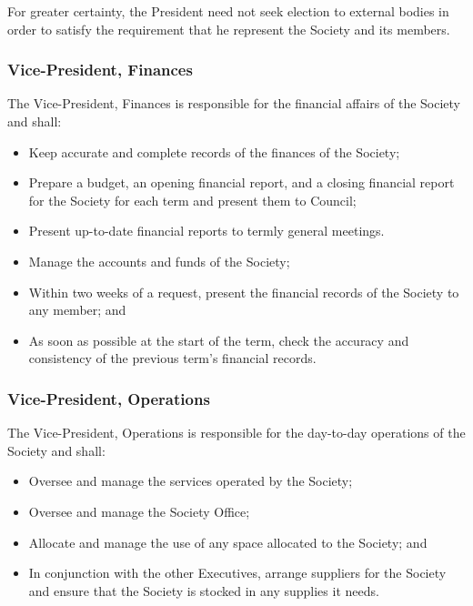 For greater certainty, the President need not seek election to external bodies
in order to satisfy the requirement that he represent the Society and its
members.

\subsubsection{Vice-President, Finances}
The Vice-President, Finances is responsible for the financial affairs of the
Society and shall:
\begin{itemize}
  \item Keep accurate and complete records of the finances of the Society;
  \item Prepare a budget, an opening financial report, and a closing financial
    report for the Society for each term and present them to Council;
  \item Present up-to-date financial reports to termly general meetings.
  \item Manage the accounts and funds of the Society;
  \item Within two weeks of a request, present the financial records of the
    Society to any member; and
  \item As soon as possible at the start of the term, check the accuracy and
    consistency of the previous term's financial records.
\end{itemize}

\subsubsection{Vice-President, Operations}
The Vice-President, Operations is responsible for the day-to-day operations of
the Society and shall:
\begin{itemize}
  \item Oversee and manage the services operated by the Society;
  \item Oversee and manage the Society Office;
  \item Allocate and manage the use of any space allocated to the Society; and
  \item In conjunction with the other Executives, arrange suppliers for the
    Society and ensure that the Society is stocked in any supplies it needs.
\end{itemize}

